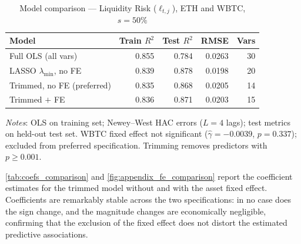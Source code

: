 \documentclass[a4paper,UKenglish,cleveref, autoref, thm-restate]{informs3}
\begin{document}
\FloatBarrier 
\begin{table}[ht]
\centering
\begin{threeparttable}
\caption{Model comparison ---
         Liquidity Risk ($\ell_{t,j}$),
         ETH and WBTC, $s = 50\%$}
\label{tab:model_comparison}
\begin{tabular}{lrrrr}
\toprule
Model
    & Train $R^2$
    & Test $R^2$
    & RMSE
    & Vars \\
\midrule
Full OLS (all vars)
    & 0.855 & 0.784 & 0.0263 & 30 \\
LASSO $\lambda_{\min}$, no FE
    & 0.839 & 0.878 & 0.0198 & 20 \\
Trimmed, no FE (preferred)
    & 0.835 & 0.868 & 0.0205 & 14 \\
Trimmed $+$ FE
    & 0.836 & 0.871 & 0.0203 & 15 \\
\bottomrule
\end{tabular}
\begin{tablenotes}[flushleft]
\setlength{\itemsep}{0pt}
\setlength{\parsep}{0pt}
\scriptsize
\item \textit{Notes}: OLS on training set; Newey--West HAC
errors ($L = 4$ lags); test metrics on held-out test set.
WBTC fixed effect not significant ($\hat{\gamma} = -0.0039$,
$p = 0.337$); excluded from preferred specification.
Trimming removes predictors with $p \geq 0.001$.
\end{tablenotes}
\end{threeparttable}
\end{table}

\autoref{tab:coefs_comparison} and \autoref{fig:appendix_fe_comparison} report the coefficient
estimates for the trimmed model without and with the asset fixed
effect. Coefficients are remarkably stable across the two
specifications: in no case does the sign change, and the
magnitude changes are economically negligible, confirming that
the exclusion of the fixed effect does not distort the estimated
predictive associations.
\end{document}
